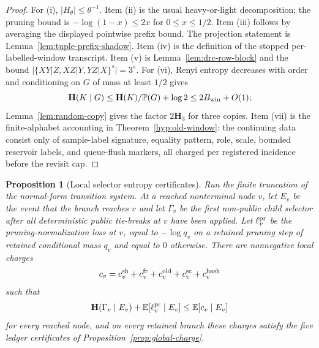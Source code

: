 \documentclass[11pt]{article}
\newtheorem{proposition}[theorem]{Proposition}
\newcommand{\Prb}{\mathbb P}
\newcommand{\EE}{\mathbb E}
\newcommand{\bfH}{\mathbf H}
\begin{document}
\begin{proof}
For (i), $|H_\theta|\le\theta^{-1}$.  Item (ii) is the usual heavy-or-light
decomposition; the pruning bound is $-\log(1-x)\le2x$ for $0\le x\le1/2$.
Item (iii) follows by averaging the displayed pointwise prefix bound.  The
projection statement is Lemma~\ref{lem:tuple-prefix-shadow}.  Item (iv) is the
definition of the stopped per-labelled-window transcript.  Item (v) is
Lemma~\ref{lem:drc-row-block} and the bound $|\{XY|Z,XZ|Y,YZ|X\}^s|=3^s$.
For (vi), Renyi entropy decreases with order and conditioning on
$G$ of mass at least $1/2$ gives
\[
  \bfH(K\mid G)\le \bfH(K)/\Prb(G)+\log2\le2B_{\rm win}+O(1);
\]
Lemma~\ref{lem:random-copy} gives the factor $2\bfH_3$ for three copies.
Item (vii) is the finite-alphabet accounting in Theorem~\ref{hyp:old-window}:
the continuing data consist only of sample-label signature, equality pattern,
role, scale, bounded reservoir labels, and queue-flush markers, all charged per
registered incidence before the revisit cap.
\end{proof}

\begin{proposition}[Local selector entropy certificates]
\label{prop:local-selector-certificates}
Run the finite truncation of the normal-form transition system.  At a reached
nonterminal node $v$, let $E_v$ be the event that the branch reaches $v$ and
let $\Gamma_v$ be the first non-public child selector after all deterministic
public tie-breaks at $v$ have been applied.  Let $\ell_v^{\rm pr}$ be the
pruning-normalization loss at $v$, equal to $-\log q_v$ on a retained pruning
step of retained conditional mass $q_v$ and equal to $0$ otherwise.  There are nonnegative local
charges
\[
  c_v=c_v^{\rm sh}+c_v^{\rm fr}+c_v^{\rm old}
      +c_v^{\rm sc}+c_v^{\rm hash}
\]
such that
\[
  \bfH(\Gamma_v\mid E_v)+\EE[\ell_v^{\rm pr}\mid E_v]\le \EE[c_v\mid E_v]
\]
for every reached node, and on every retained branch these charges satisfy the
five ledger certificates of Proposition~\ref{prop:global-charge}.
\end{proposition}
\end{document}
